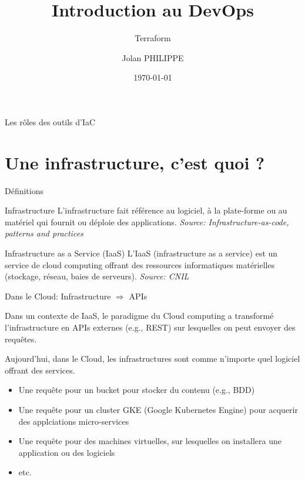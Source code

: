 \documentclass[aspectratio=169,10pt]{beamer}
\title{Introduction au DevOps}
\subtitle{Terraform}
\date{\today}
\author{Jolan PHILIPPE}
\institute{Université d'Orléans}
\begin{document}
\begin{frame}
    \titlepage 
\end{frame}

\begin{frame}{Les rôles des outils d'IaC}

\hspace*{-0.7cm}


\end{frame}

\section{Une infrastructure, c'est quoi ?}

\begin{frame}{Définitions}

\begin{alertblock}{Infrastructure}
L'infrastructure fait référence au logiciel, à la plate-forme ou au matériel qui fournit ou déploie des applications. \textit{Source: Infrastructure-as-code, patterns and practices}
\end{alertblock}

\begin{alertblock}{Infrastructure as a Service (IaaS)}
L’IaaS (infrastructure as a service) est un service de cloud computing offrant des ressources informatiques matérielles (stockage, réseau, baies de serveurs). \textit{Source: CNIL}
\end{alertblock}
    
\end{frame}


\begin{frame}{Dans le Cloud: Infrastructure $\Rightarrow$ APIs}

Dans un contexte de IaaS, le paradigme du Cloud computing a transformé l'\alert{infrastructure en APIs externes} (e.g., REST) sur lesquelles on peut envoyer des requêtes.

Aujourd'hui, dans le Cloud, les infrastructures sont comme n'importe quel logiciel offrant des services.
\begin{itemize}
    \item Une requête pour un bucket pour stocker du contenu (e.g., BDD)
    \item Une requête pour un cluster GKE (Google Kubernetes Engine) pour acquerir des applciations micro-services
    \item Une requête pour des machines virtuelles, sur lesquelles on installera une application ou des logiciels
    \item etc.
\end{itemize}
    
\end{frame}
\end{document}
